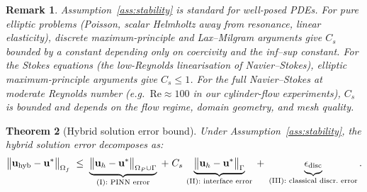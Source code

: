 \documentclass[11pt]{article}
\newtheorem{theorem}{Theorem}
\newtheorem{remark}[theorem]{Remark}
\begin{document}
\begin{remark}
Assumption~\ref{ass:stability} is standard for well-posed PDEs.  For pure
elliptic problems (Poisson, scalar Helmholtz away from resonance, linear
elasticity), discrete maximum-principle and Lax--Milgram arguments give $C_s$
bounded by a constant depending only on coercivity and the inf--sup constant.
For the Stokes equations (the low-Reynolds linearisation of Navier--Stokes),
elliptic maximum-principle arguments give $C_s \le 1$.  For the full
Navier--Stokes at moderate Reynolds number (e.g.\ $\mathrm{Re} \approx 100$ in
our cylinder-flow experiments), $C_s$ is bounded and depends on the flow regime,
domain geometry, and mesh quality.
\end{remark}

\begin{theorem}[Hybrid solution error bound]\label{thm:error-bound}
Under Assumption~\ref{ass:stability}, the hybrid solution error decomposes as:
\begin{equation}\label{eq:error-bound}
  \bigl\|\mathbf{u}_{\mathrm{hyb}} - \mathbf{u}^*\bigr\|_{\Omega_f}
  \;\le\;
  \underbrace{\bigl\|\mathbf{u}_h - \mathbf{u}^*\bigr\|_{\Omega_P \cup \Gamma}
    \vphantom{\bigl\|}}_{\text{(I): PINN error}}
  \;+\; C_s\,\underbrace{\bigl\|\mathbf{u}_h - \mathbf{u}^*\bigr\|_{\Gamma}
    \vphantom{\bigl\|}}_{\text{(II): interface error}}
  \;+\; \underbrace{\epsilon_{\mathrm{disc}}
    \vphantom{\bigl\|}}_{\text{(III): classical discr.\ error}}.
\end{equation}
\end{theorem}
\end{document}

